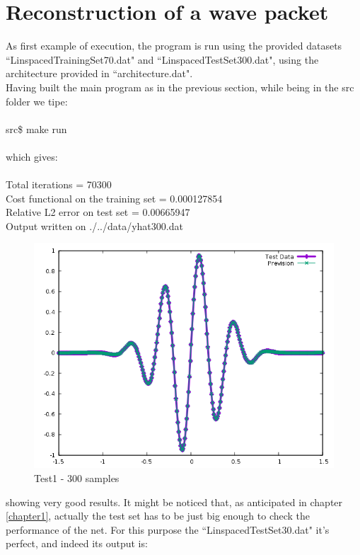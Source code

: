 \documentclass[12pt, a4paper]{report}
\theoremstyle{definition}
\begin{document}
\section{Reconstruction of a wave packet}
As first example of execution, the program is run using the provided datasets ``LinspacedTrainingSet70.dat" and ``LinspacedTestSet300.dat", using the architecture provided in ``architecture.dat".\\
Having built the main program as in the previous section, while being in the src folder we tipe:\\
{\\ \ttfamily 
	src\$ make run\\
\\}
which gives:\\
{\\ \ttfamily 
Total iterations = 70300\\
Cost functional on the training set = 0.000127854\\
Relative L2 error on test set = 0.00665947\\
Output written on ./../data/yhat300.dat\\
}
\begin{figure}[H]
	\centering
	\includegraphics[width=\textwidth]{img/Prevision300} 
	\caption{Test1 - 300 samples}
\end{figure}
\noindent showing very good results. It might be noticed that, as anticipated in chapter \ref{chapter1}, actually the test set has to be just big enough to check the performance of the net. For this purpose the ``LinspacedTestSet30.dat" it's perfect, and indeed its output is:\\
\end{document}
